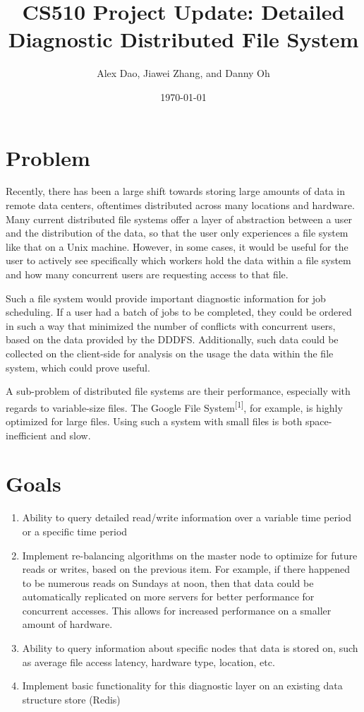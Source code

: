 \documentclass{article}
\title{CS510 Project Update: Detailed Diagnostic Distributed File System}
\date{\today}
\author{Alex Dao, Jiawei Zhang, and Danny Oh}
\begin{document}
\maketitle

\section{Problem}
Recently, there has been a large shift towards storing large amounts of data in remote data centers, oftentimes distributed across many locations and hardware. Many current distributed file systems offer a layer of abstraction between a user and the distribution of the data, so that the user only experiences a file system like that on a Unix machine. However, in some cases, it would be useful for the user to actively see specifically which workers hold the data within a file system and how many concurrent users are requesting access to that file. 

Such a file system would provide important diagnostic information for job scheduling. If a user had a batch of jobs to be completed, they could be ordered in such a way that minimized the number of conflicts with concurrent users, based on the data provided by the DDDFS. Additionally, such data could be collected on the client-side for analysis on the usage the data within the file system, which could prove useful.

A sub-problem of distributed file systems are their performance, especially with regards to variable-size files. The Google File System\textsuperscript{[1]}, for example, is highly optimized for large files. Using such a system with small files is both space-inefficient and slow. 

\section{Goals}
\begin{enumerate}
\item Ability to query detailed read/write information over a variable time period or a specific time period
\item Implement re-balancing algorithms on the master node to optimize for future reads or writes, based on the previous item. For example, if there happened to be numerous reads on Sundays at noon, then that data could be automatically replicated on more servers for better performance for concurrent accesses. This allows for increased performance on a smaller amount of hardware. 
\item Ability to query information about specific nodes that data is stored on, such as average file access latency, hardware type, location, etc. 
\item Implement basic functionality for this diagnostic layer on an existing data structure store (Redis)
\end{enumerate}
\end{document}
